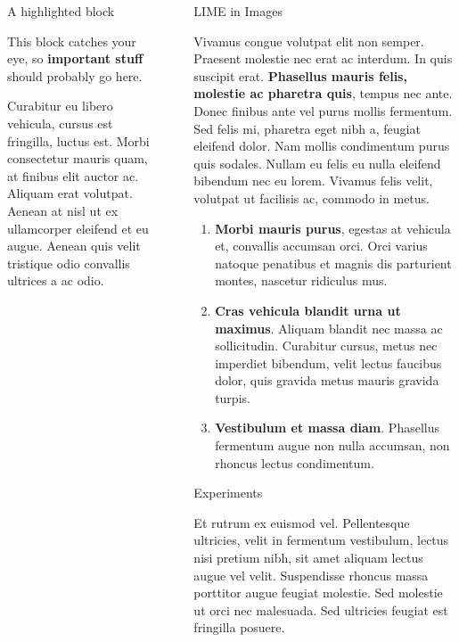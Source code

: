 \documentclass[final]{beamer}
\newlength{\sepwidth}
\newlength{\colwidth}
\newcommand{\separatorcolumn}{\begin{column}{\sepwidth}\end{column}}
\begin{document}
\begin{frame}[t]
\begin{columns}[t]
\begin{column}{\colwidth}
  \begin{alertblock}{A highlighted block}

    This block catches your eye, so \textbf{important stuff} should probably go
    here.

    Curabitur eu libero vehicula, cursus est fringilla, luctus est. Morbi
    consectetur mauris quam, at finibus elit auctor ac. Aliquam erat volutpat.
    Aenean at nisl ut ex ullamcorper eleifend et eu augue. Aenean quis velit
    tristique odio convallis ultrices a ac odio.
  \end{alertblock}

\end{column}

\separatorcolumn

\begin{column}{\colwidth}

  \begin{block}{LIME in Images}

    Vivamus congue volutpat elit non semper. Praesent molestie nec erat ac
    interdum. In quis suscipit erat. \textbf{Phasellus mauris felis, molestie
    ac pharetra quis}, tempus nec ante. Donec finibus ante vel purus mollis
    fermentum. Sed felis mi, pharetra eget nibh a, feugiat eleifend dolor. Nam
    mollis condimentum purus quis sodales. Nullam eu felis eu nulla eleifend
    bibendum nec eu lorem. Vivamus felis velit, volutpat ut facilisis ac,
    commodo in metus.

    \begin{enumerate}
      \item \textbf{Morbi mauris purus}, egestas at vehicula et, convallis
        accumsan orci. Orci varius natoque penatibus et magnis dis parturient
        montes, nascetur ridiculus mus.
      \item \textbf{Cras vehicula blandit urna ut maximus}. Aliquam blandit nec
        massa ac sollicitudin. Curabitur cursus, metus nec imperdiet bibendum,
        velit lectus faucibus dolor, quis gravida metus mauris gravida turpis.
      \item \textbf{Vestibulum et massa diam}. Phasellus fermentum augue non
        nulla accumsan, non rhoncus lectus condimentum.
    \end{enumerate}

  \end{block}

  \begin{block}{Experiments}

    Et rutrum ex euismod vel. Pellentesque ultricies, velit in fermentum
    vestibulum, lectus nisi pretium nibh, sit amet aliquam lectus augue vel
    velit. Suspendisse rhoncus massa porttitor augue feugiat molestie. Sed
    molestie ut orci nec malesuada. Sed ultricies feugiat est fringilla
    posuere.


\end{block}
\end{column}
\end{columns}
\end{frame}
\end{document}
